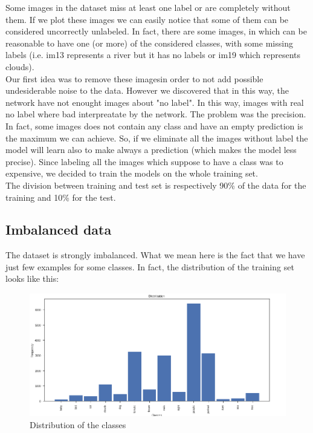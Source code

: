 Some images in the dataset miss at least one label or are completely without them. If we plot these images we can easily notice that some of them can be considered uncorrectly unlabeled. In fact, there are some images, in which can be reasonable to have one (or more) of the considered classes, with some missing labels (i.e. im13 represents a river but it has no labels or im19 which represents clouds). \\
Our first idea was to remove these imagesin order to not add possible undesiderable noise to the data. However we discovered that in this way, the network have not enought images about "no label". In this way, images with real no label where bad interpreatate by the network.
The problem was the precision. In fact, some images does not contain any class and have an empty prediction is the maximum we can achieve. So, if we eliminate all the images without label the model will learn also to make always a prediction (which makes the model less precise).
Since labeling all the images which suppose to have a class was to expensive, we decided to train the models on the whole training set. \\
The division between training and test set is respectively 90\% of the data for the training and 10\% for the test.

\subsection{Imbalanced data}

The dataset is strongly imbalanced. What we mean here is the fact that we have just few examples for some classes. In fact, the distribution of the training set looks like this:

\begin{figure}[!h]
	\begin{center}
		\includegraphics[width=0.6\linewidth]{images/distribution}
		\caption{Distribution of the classes}
		\label{fig:distribution-classes}
	\end{center}
\end{figure}

